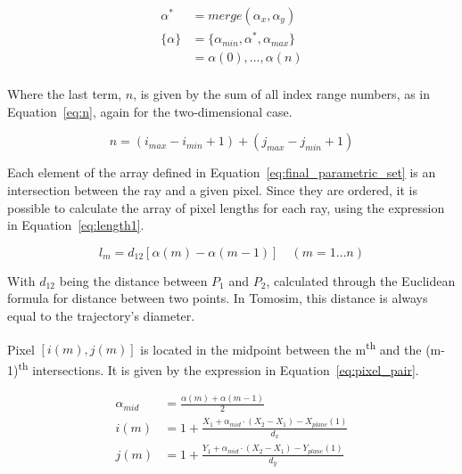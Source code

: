 \begin{equation}
    \label{eq:final_parametric_set}
    \begin{aligned}
        \alpha^* &= merge(\alpha_x, \alpha_y)\\
        \{ \alpha \} &= \{ \alpha_{min}, \alpha^*, \alpha_{max} \}\\
                     &= \alpha(0), \ldots, \alpha(n)\\
    \end{aligned}
\end{equation}

Where the last term, $n$, is given by the sum of all index range
numbers, as in Equation~\ref{eq:n}, again for the two-dimensional case.

\begin{equation}
    \label{eq:n}
    n = (i_{max} - i_{min} + 1) + (j_{max} - j_{min} + 1)
\end{equation}

Each element of the array defined in
Equation~\ref{eq:final_parametric_set} is an intersection between the
ray and a given pixel. Since they are ordered, it is possible to
calculate the array of pixel lengths for each ray, using the expression
in Equation~\ref{eq:length1}.

\begin{equation}
    \label{eq:length1}
    l_{m} = d_{12}[ \alpha(m) - \alpha(m-1)] \quad (m = 1 \ldots n)
\end{equation}

With $d_{12}$ being the distance between $P_1$ and $P_2$, calculated
through the Euclidean formula for distance between two points. In
Tomosim, this distance is always equal to the trajectory's diameter.

Pixel $[i(m), j(m)]$ is located in the midpoint between the
m\textsuperscript{th} and the (m-1)\textsuperscript{th} intersections.
It is given by the expression in Equation~\ref{eq:pixel_pair}.

\begin{equation}
    \label{eq:pixel_pair}
    \begin{aligned}
        \alpha_{mid} &= \frac{\alpha(m) + \alpha(m-1)}{2}\\
        i(m) &= 1 + \frac{X_1 + \alpha_{mid}\cdot(X_2 - X_1) -
            X_{plane}(1)}{d_x}\\
        j(m) &= 1 + \frac{Y_1 + \alpha_{mid}\cdot(X_2 - X_1) -
            Y_{plane}(1)}{d_y}\\
    \end{aligned}
\end{equation}




